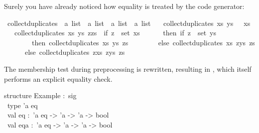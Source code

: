 \begin{isabellebody}
\begin{isamarkuptext}
\begin{itemize}
  \end{itemize}%
\end{isamarkuptext}%
\isamarkuptrue%
%
\isamarkuptrue%
%
\begin{isamarkuptext}%
Surely you have already noticed how equality is treated
  by the code generator:%
\end{isamarkuptext}%
\isamarkuptrue%
%
\isadelimquote
%
\endisadelimquote
%
\isatagquote
{}\isamarkupfalse%
\ collect{\isacharunderscore}duplicates\ {\isacharcolon}{\isacharcolon}\ {\isachardoublequoteopen}{\isacharprime}a\ list\ {\isasymRightarrow}\ {\isacharprime}a\ list\ {\isasymRightarrow}\ {\isacharprime}a\ list\ {\isasymRightarrow}\ {\isacharprime}a\ list{\isachardoublequoteclose}\ \isanewline
\ \ {\isachardoublequoteopen}collect{\isacharunderscore}duplicates\ xs\ ys\ {\isacharbrackleft}{\isacharbrackright}\ {\isacharequal}\ xs{\isachardoublequoteclose}\isanewline
\ \ {\isacharbar}\ {\isachardoublequoteopen}collect{\isacharunderscore}duplicates\ xs\ ys\ {\isacharparenleft}z{\isacharhash}zs{\isacharparenright}\ {\isacharequal}\ {\isacharparenleft}if\ z\ {\isasymin}\ set\ xs\isanewline
\ \ \ \ \ \ then\ if\ z\ {\isasymin}\ set\ ys\isanewline
\ \ \ \ \ \ \ \ then\ collect{\isacharunderscore}duplicates\ xs\ ys\ zs\isanewline
\ \ \ \ \ \ \ \ else\ collect{\isacharunderscore}duplicates\ xs\ {\isacharparenleft}z{\isacharhash}ys{\isacharparenright}\ zs\isanewline
\ \ \ \ \ \ else\ collect{\isacharunderscore}duplicates\ {\isacharparenleft}z{\isacharhash}xs{\isacharparenright}\ {\isacharparenleft}z{\isacharhash}ys{\isacharparenright}\ zs{\isacharparenright}{\isachardoublequoteclose}%
\endisatagquote
{\isafoldquote}%
%
\isadelimquote
%
\endisadelimquote
%
\begin{isamarkuptext}%
\noindent The membership test during preprocessing is rewritten,
  resulting in , which itself
  performs an explicit equality check.%
\end{isamarkuptext}%
\isamarkuptrue%
%
\isadelimquote
%
\endisadelimquote
%
\isatagquote
%
\begin{isamarkuptext}%
\isatypewriter%
\noindent%
\hspace*{0pt}structure Example :~sig\\
\hspace*{0pt} ~type 'a eq\\
\hspace*{0pt} ~val eq :~'a eq -> 'a -> 'a -> bool\\
\hspace*{0pt} ~val eqa :~'a eq -> 'a -> 'a -> bool\\

\end{isamarkuptext}
\end{isabellebody}
